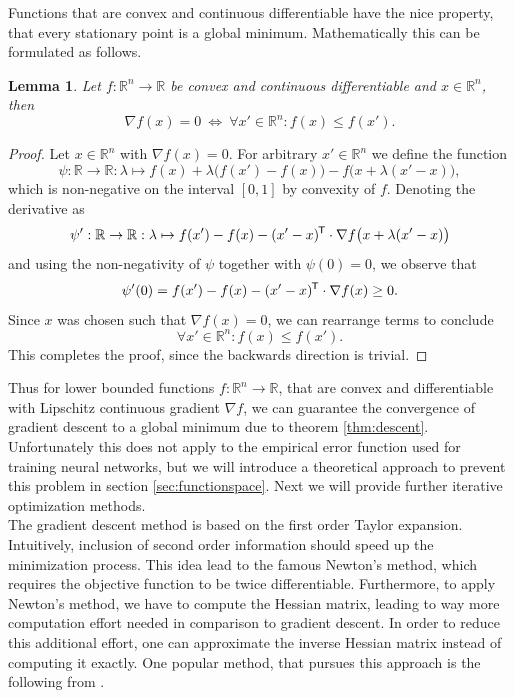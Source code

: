 \documentclass[11pt, a4paper]{article}
\newtheorem{lemma}[theorem]{Lemma}
\newcommand{\R}{\mathbb{R}}
\newcommand*{\tr}{^{\mkern-1.5mu\mathsf{T}}}
\begin{document}
Functions that are convex and continuous differentiable have the nice property, that every stationary point is a global minimum. Mathematically this can be formulated as follows.

\begin{lemma}
Let $f: \R^n \to \R$ be convex and continuous differentiable and $x \in \R^n$, then
\[ \nabla f(x) = 0 \ \Leftrightarrow \ \forall x' \in \R^n : f(x) \leq f(x').  \]
\end{lemma}

\begin{proof}
Let $x \in \R^n$ with $\nabla f(x) = 0$. For arbitrary $x' \in \R^n$ we define the function
\[ \psi : \R \to \R : \lambda \mapsto f(x) + \lambda \big ( f(x') - f(x) \big ) - f \big ( x + \lambda (x'-x) \big ), \]
which is non-negative on the interval $[0,1]$ by convexity of $f$. Denoting the derivative as
\[ \psi' : \R \to \R : \lambda \mapsto f(x') - f(x) - (x'-x) \tr \cdot \nabla f \big (x + \lambda(x'-x)\big ) \]
and using the non-negativity of $\psi$ together with $\psi(0) = 0$, we observe that
\[ \psi'(0) = f(x') - f(x) - (x'-x) \tr \cdot \nabla f(x) \geq 0. \]
Since $x$ was chosen such that $\nabla f(x) = 0$, we can rearrange terms to conclude
\[ \forall x' \in \R^n : f(x) \leq f(x'). \]
This completes the proof, since the backwards direction is trivial.
\end{proof}

Thus for lower bounded functions $f: \R^n \to \R$, that are convex and differentiable with Lipschitz continuous gradient $\nabla f$, we can guarantee the convergence of gradient descent to a global minimum due to theorem \ref{thm:descent}. Unfortunately this does not apply to the empirical error function used for training neural networks, but we will introduce a theoretical approach to prevent this problem in section \ref{sec:functionspace}. Next we will provide further iterative optimization methods. \\

The gradient descent method is based on the first order Taylor expansion. Intuitively, inclusion of second order information should speed up the minimization process. This idea lead to the famous Newton's method, which requires the objective function to be twice differentiable. Furthermore, to apply Newton's method, we have to compute the Hessian matrix, leading to way more computation effort needed in comparison to gradient descent. In order to reduce this additional effort, one can approximate the inverse Hessian matrix instead of computing it exactly. One popular method, that pursues this approach is the following from \cite{BFGS}.
\end{document}
